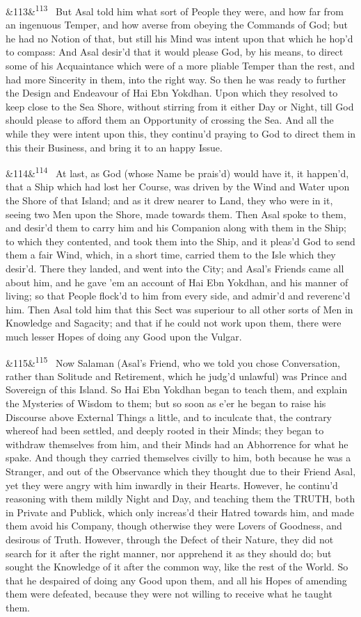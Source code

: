\documentclass[12pt]{article}
\newcommand{\para}[1][]{\par\noindent\ifx&#1&\else\textsuperscript{\footnotesize #1}~\fi}
\begin{document}
\para[113] But Asal told him what sort of People they were, and how far from an ingenuous Temper, and how averse from obeying the Commands of God; but he had no Notion of that, but still his Mind was intent upon that which he hop'd to compass: And Asal desir'd that it would please God, by his means, to direct some of his Acquaintance which were of a more pliable Temper than the rest, and had more Sincerity in them, into the right way. So then he was ready to further the Design and Endeavour of Hai Ebn Yokdhan. Upon which they resolved to keep close to the Sea Shore, without stirring from it either Day or Night, till God should please to afford them an Opportunity of crossing the Sea. And all the while they were intent upon this, they continu'd praying to God to direct them in this their Business, and bring it to an happy Issue.

\para[114] At last, as God (whose Name be prais'd) would have it, it happen'd, that a Ship which had lost her Course, was driven by the Wind and Water upon the Shore of that Island; and as it drew nearer to Land, they who were in it, seeing two Men upon the Shore, made towards them. Then Asal spoke to them, and desir'd them to carry him and his Companion along with them in the Ship; to which they contented, and took them into the Ship, and it pleas'd God to send them a fair Wind, which, in a short time, carried them to the Isle which they desir'd. There they landed, and went into the City; and Asal's Friends came all about him, and he gave 'em an account of Hai Ebn Yokdhan, and his manner of living; so that People flock'd to him from every side, and admir'd and reverenc'd him. Then Asal told him that this Sect was superiour to all other sorts of Men in Knowledge and Sagacity; and that if he could not work upon them, there were much lesser Hopes of doing any Good upon the Vulgar.

\para[115] Now Salaman (Asal's Friend, who we told you chose Conversation, rather than Solitude and Retirement, which he judg'd unlawful) was Prince and Sovereign of this Island. So Hai Ebn Yokdhan began to teach them, and explain the Mysteries of Wisdom to them; but so soon as e'er he began to raise his Discourse above External Things a little, and to inculcate that, the contrary whereof had been settled, and deeply rooted in their Minds; they began to withdraw themselves from him, and their Minds had an Abhorrence for what he spake. And though they carried themselves civilly to him, both because he was a Stranger, and out of the Observance which they thought due to their Friend Asal, yet they were angry with him inwardly in their Hearts. However, he continu'd reasoning with them mildly Night and Day, and teaching them the TRUTH, both in Private and Publick, which only increas'd their Hatred towards him, and made them avoid his Company, though otherwise they were Lovers of Goodness, and desirous of Truth. However, through the Defect of their Nature, they did not search for it after the right manner, nor apprehend it as they should do; but sought the Knowledge of it after the common way, like the rest of the World. So that he despaired of doing any Good upon them, and all his Hopes of amending them were defeated, because they were not willing to receive what he taught them.
\end{document}
